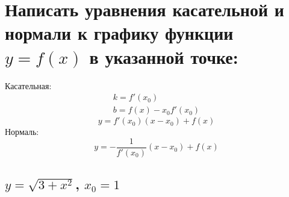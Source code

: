 \documentclass[12pt]{article}
\begin{document}
\begin{sloppypar}
    \section{Написать уравнения касательной и нормали к графику функции $y=f(x)$ в указанной точке:}
    Касательная:
    \[
        \begin{array}{l}
            k = f'(x_0) \\
            b = f(x) - x_0 f'(x_0)
        \end{array}
    \]
    \[
        y = f'(x_0)(x - x_0) + f(x)
    \]
    Нормаль:
    \[
        y = -\dfrac{1}{f'(x_0)}(x - x_0) + f(x)
    \]
    \subsection{$y = \sqrt{3 + x^2}$, $x_0 = 1$}


\end{sloppypar}
\end{document}
